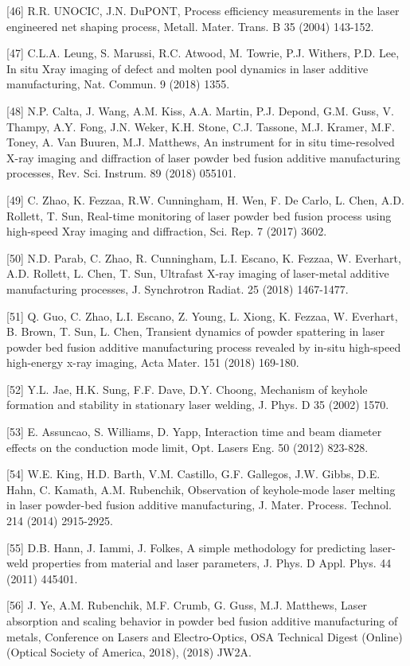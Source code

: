 \documentclass[10pt]{article}
\begin{document}
[46] R.R. UNOCIC, J.N. DuPONT, Process efficiency measurements in the laser engineered net shaping process, Metall. Mater. Trans. B 35 (2004) 143-152.

[47] C.L.A. Leung, S. Marussi, R.C. Atwood, M. Towrie, P.J. Withers, P.D. Lee, In situ Xray imaging of defect and molten pool dynamics in laser additive manufacturing, Nat. Commun. 9 (2018) 1355.

[48] N.P. Calta, J. Wang, A.M. Kiss, A.A. Martin, P.J. Depond, G.M. Guss, V. Thampy, A.Y. Fong, J.N. Weker, K.H. Stone, C.J. Tassone, M.J. Kramer, M.F. Toney, A. Van Buuren, M.J. Matthews, An instrument for in situ time-resolved X-ray imaging and diffraction of laser powder bed fusion additive manufacturing processes, Rev. Sci. Instrum. 89 (2018) 055101.

[49] C. Zhao, K. Fezzaa, R.W. Cunningham, H. Wen, F. De Carlo, L. Chen, A.D. Rollett, T. Sun, Real-time monitoring of laser powder bed fusion process using high-speed Xray imaging and diffraction, Sci. Rep. 7 (2017) 3602.

[50] N.D. Parab, C. Zhao, R. Cunningham, L.I. Escano, K. Fezzaa, W. Everhart, A.D. Rollett, L. Chen, T. Sun, Ultrafast X-ray imaging of laser-metal additive manufacturing processes, J. Synchrotron Radiat. 25 (2018) 1467-1477.

[51] Q. Guo, C. Zhao, L.I. Escano, Z. Young, L. Xiong, K. Fezzaa, W. Everhart, B. Brown, T. Sun, L. Chen, Transient dynamics of powder spattering in laser powder bed fusion additive manufacturing process revealed by in-situ high-speed high-energy x-ray imaging, Acta Mater. 151 (2018) 169-180.

[52] Y.L. Jae, H.K. Sung, F.F. Dave, D.Y. Choong, Mechanism of keyhole formation and stability in stationary laser welding, J. Phys. D 35 (2002) 1570.

[53] E. Assuncao, S. Williams, D. Yapp, Interaction time and beam diameter effects on the conduction mode limit, Opt. Lasers Eng. 50 (2012) 823-828.

[54] W.E. King, H.D. Barth, V.M. Castillo, G.F. Gallegos, J.W. Gibbs, D.E. Hahn, C. Kamath, A.M. Rubenchik, Observation of keyhole-mode laser melting in laser powder-bed fusion additive manufacturing, J. Mater. Process. Technol. 214 (2014) 2915-2925.

[55] D.B. Hann, J. Iammi, J. Folkes, A simple methodology for predicting laser-weld properties from material and laser parameters, J. Phys. D Appl. Phys. 44 (2011) 445401.

[56] J. Ye, A.M. Rubenchik, M.F. Crumb, G. Guss, M.J. Matthews, Laser absorption and scaling behavior in powder bed fusion additive manufacturing of metals, Conference on Lasers and Electro-Optics, OSA Technical Digest (Online) (Optical Society of America, 2018), (2018) JW2A.
\end{document}
